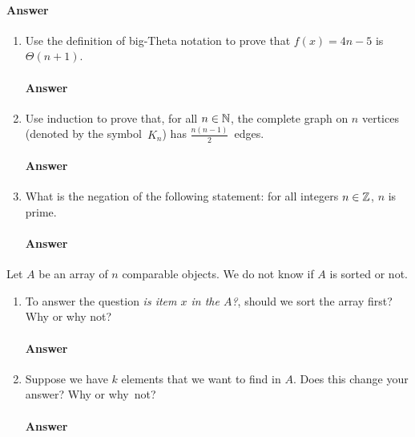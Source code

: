 \documentclass{article}
\begin{document}
\paragraph{Answer}
\todo{}

\collab{\todo{}}

\begin{enumerate}

    \item Use the definition of big-Theta notation to prove that $f(x)=4n-5$
        is $\Theta(n+1)$.

        \paragraph{Answer}
        \todo{}

    \item Use induction to prove that, for all $n \in {\mathbb N}$, the complete graph on
        $n$ vertices (denoted by the symbol~$K_n$) has $\frac{n(n-1)}{2}$~edges.

        \paragraph{Answer}
        \todo{}

    \item What is the negation of the following statement: for all integers $n
        \in {\mathbb Z}$, $n$ is prime.

        \paragraph{Answer}
        \todo{}

\end{enumerate}


\collab{\todo{}}
Let $A$ be an array of $n$ comparable objects.  We do not know if $A$ is sorted
or not.

\begin{enumerate}
    \item To answer the question \emph{is item $x$ in the $A$?}, should we
        sort the array first?  Why or why not?

        \paragraph{Answer}
        \todo{}

    \item Suppose we have $k$ elements that we want to find in $A$. Does this
        change your answer? Why or why~not?

        \paragraph{Answer}
        \todo{}

\end{enumerate}
\end{document}
